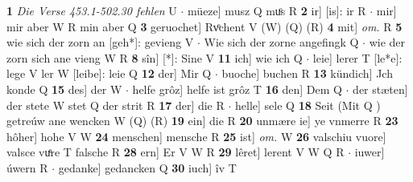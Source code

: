 \documentclass[8pt,a4paper,notitlepage]{article}
\begin{document}
\begin{table}[ht]
\begin{minipage}[t]{0.5\linewidth}
\textbf{1} \textit{Die Verse 453.1-502.30 fehlen} U   $\cdot$ müeze] musz Q muͦs R \textbf{2} ir] [is]: ir R  $\cdot$ mir] mir aber W R min aber Q \textbf{3} geruochet] Rvͦchent V (W) (Q) (R) \textbf{4} mit] \textit{om.} R \textbf{5} wie sich der zorn an [geh*]: gevieng V  $\cdot$ Wie sich der zorne angefingk Q  $\cdot$ wie der zorn sich ane vieng W R \textbf{8} sîn] [*]: Sine V \textbf{11} ich] wie ich Q  $\cdot$ leie] lerer T [le*e]: lege V ler W [leibe]: leie Q \textbf{12} der] Mir Q  $\cdot$ buoche] buchen R \textbf{13} kündich] Jch konde Q \textbf{15} des] der W  $\cdot$ helfe grôz] helfe ist grôz T \textbf{16} den] Dem Q  $\cdot$ der stæten] der stete W stet Q der strit R \textbf{17} der] die R  $\cdot$ helle] sele Q \textbf{18} Seit (Mit Q ) getreúw ane wencken W (Q) (R) \textbf{19} ein] die R \textbf{20} unmære ie] ye vnmerre R \textbf{23} hôher] hohe V W \textbf{24} menschen] mensche R \textbf{25} ist] \textit{om.} W \textbf{26} valschiu vuore] valsce vuͤre T falsche R \textbf{28} ern] Er V W R \textbf{29} lêret] lerent V W Q R  $\cdot$ iuwer] úwern R  $\cdot$ gedanke] gedancken Q \textbf{30} iuch] îv T \newline
\end{minipage}
\end{table}
\end{document}
